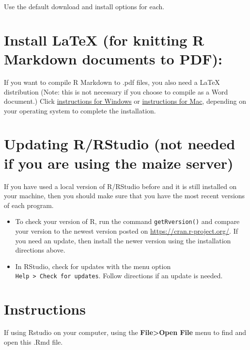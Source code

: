 \documentclass[
]{book}
\begin{document}
Use the default download and install options for each.

\hypertarget{install-latex-for-knitting-r-markdown-documents-to-pdf}{%
\section{Install LaTeX (for knitting R Markdown documents to PDF):}\label{install-latex-for-knitting-r-markdown-documents-to-pdf}}

If you want to compile R Markdown to .pdf files, you also need a LaTeX distribution (Note: this is not necessary if you choose to compile as a Word document.) Click \href{http://www.miktex.org/}{instructions for Windows} or \href{https://tug.org/mactex/}{instructions for Mac}, depending on your operating system to complete the installation.

\hypertarget{updating-rrstudio-not-needed-if-you-are-using-the-maize-server}{%
\section{Updating R/RStudio (not needed if you are using the maize server)}\label{updating-rrstudio-not-needed-if-you-are-using-the-maize-server}}

If you have used a local version of R/RStudio before and it is still installed on your machine, then you should make sure that you have the most recent versions of each program.

\begin{itemize}
\item
  To check your version of R, run the command \texttt{getRversion()} and compare your version to the newest version posted on \url{https://cran.r-project.org/}. If you need an update, then install the newer version using the installation directions above.
\item
  In RStudio, check for updates with the menu option \texttt{Help\ \textgreater{}\ Check\ for\ updates}. Follow directions if an update is needed.
\end{itemize}

\hypertarget{instructions}{%
\section{Instructions}\label{instructions}}

If using Rstudio on your computer, using the \textbf{File\textgreater Open File} menu to find and open this .Rmd file.
\end{document}
